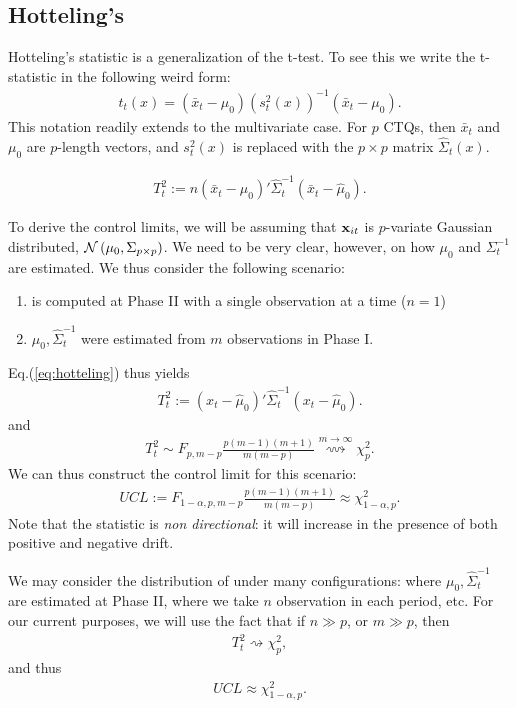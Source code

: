 \subsection{Hotteling's \tsq}
Hotteling's \tsq statistic is a generalization of the t-test.
To see this we write the t-statistic in the following weird form:
\begin{align}
	t_t(x)=(\bar{x}_t-\mu_0) (s^2_t(x))^{-1} (\bar{x}_t-\mu_0).
\end{align}
This notation readily extends to the multivariate case. 
For $p$ CTQs, then $\bar{x}_t$ and $\mu_0$ are $p$-length vectors, and $s^2_t(x)$ is replaced with the $p \times p$ matrix $\hat{\Sigma}_t(x)$.
\begin{definition}
\begin{align}
\label{eq:hotteling}
	T^2_t := n (\bar{x}_t-\hat{\mu}_0)' \hat{\Sigma}_t^{-1} (\bar{x}_t-\hat{\mu}_0).
\end{align}
\end{definition}
To derive the control limits, we will be assuming that $\mathbf{x}_{it}$ is $p$-variate Gaussian distributed, $\mathcal{N}\left(\mu_0, \Sigma_{p \times p}\right)$. 
We need to be very clear, however, on how $\mu_0$ and $\Sigma_t^{-1}$ are estimated. 
We thus consider the following scenario:
\begin{enumerate}
\item \tsq is computed at Phase II with a single observation at a time ($n=1$)
\item $\mu_0,\hat{\Sigma}_t^{-1}$ were estimated from $m$ observations in Phase I.
\end{enumerate}
Eq.(\ref{eq:hotteling}) thus yields 
\begin{align}
	T^2_t := (x_t-\hat{\mu}_0)' \hat{\Sigma}_t^{-1} (x_t-\hat{\mu}_0).
\end{align}
and 
\begin{align}
	T^2_t \sim F_{p,m-p} \frac{p(m-1)(m+1)}{m(m-p)} \overset{m \to \infty}{\rightsquigarrow }\chi^2_p.
\end{align}
We can thus construct the control limit for this scenario:
\begin{align}
	UCL:= F_{1-\alpha,p,m-p} \frac{p(m-1)(m+1)}{m(m-p)} \approx \chi^2_{1-\alpha,p}.
\end{align}
Note that the \tsq statistic is \emph{non directional}: it will increase in the presence of both positive and negative drift. 

We may consider the distribution of \tsq under many configurations: where $\mu_0,\hat{\Sigma}_t^{-1}$ are estimated at Phase II, where we take $n$ observation in each period, etc. 
For our current purposes, we will use the fact that if $n \gg p$, or $m \gg p$, then 
\begin{align}
	T^2_t  \rightsquigarrow \chi^2_p,
\end{align}
and thus
\begin{align}
	UCL \approx \chi^2_{1-\alpha,p}.
\end{align}

